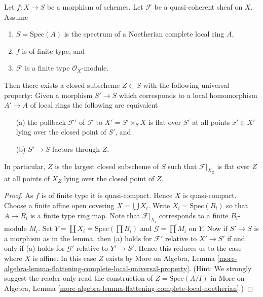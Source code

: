 \begin{lemma}
\label{lemma-flattening-complete-noetherian}
Let $f : X \to S$ be a morphism of schemes.
Let $\mathcal{F}$ be a quasi-coherent sheaf on $X$.
Assume
\begin{enumerate}
\item $S = \text{Spec}(A)$ is the spectrum of a Noetherian complete
local ring $A$,
\item $f$ is of finite type, and
\item $\mathcal{F}$ is a finite type $\mathcal{O}_X$-module.
\end{enumerate}
Then there exists a closed subscheme $Z \subset S$ with the following
universal property: Given a morphism $S' \to S$ which corresponds to
a local homomorphism $A' \to A$ of local rings the following
are equivalent
\begin{enumerate}
\item[(a)] the pullback $\mathcal{F}'$ of $\mathcal{F}$ to
$X' = S' \times_S X$ is flat over $S'$ at all points $x' \in X'$
lying over the closed point of $S'$, and
\item[(b)] $S' \to S$ factors through $Z$.
\end{enumerate}
In particular, $Z$ is the largest closed subscheme of $S$ such that
$\mathcal{F}|_{X_Z}$ is flat over $Z$ at all points
of $X_Z$ lying over the closed point of $Z$.
\end{lemma}

\begin{proof}
As $f$ is of finite type it is quasi-compact. Hence $X$ is quasi-compact.
Choose a finite affine open covering $X = \bigcup X_i$.
Write $X_i = \text{Spec}(B_i)$ so that $A \to B_i$ is a finite type
ring map. Note that $\mathcal{F}|_{X_i}$ corresponds to a finite
$B_i$-module $M_i$. Set $Y = \coprod X_i = \text{Spec}(\prod B_i)$
and $\mathcal{G} = \widetilde{\prod M_i}$ on $Y$.
Now if $S' \to S$ is a morphism as in the lemma, then (a) holds
for $\mathcal{F}'$ relative to $X' \to S'$ if and only if (a) holds for
$\mathcal{G}'$ relative to $Y' \to S'$. Hence this
reduces us to the case where $X$ is affine.
In this case $Z$ exists by
More on Algebra,
Lemma \ref{more-algebra-lemma-flattening-complete-local-universal-property}.
(Hint: We strongly suggest the reader only read the construction of
$Z = \text{Spec}(A/I)$ in
More on Algebra,
Lemma \ref{more-algebra-lemma-flattening-complete-local-noetherian}.)
\end{proof}












